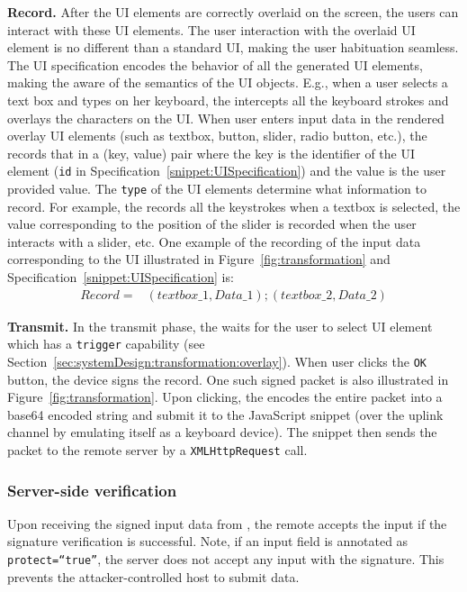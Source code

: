 \begin{mylist}
\item \textbf{Record.} After the UI elements are correctly overlaid on the screen, the users can interact with these UI elements. The user interaction with the overlaid UI element is no different than a standard UI, making the user habituation seamless. The UI specification encodes the behavior of all the generated UI elements, making the \device aware of the semantics of the UI objects. E.g., when a user selects a text box and types on her keyboard, the \device intercepts all the keyboard strokes and overlays the characters on the UI.
When user enters input data in the rendered overlay UI elements (such as textbox, button, slider, radio button, etc.), the \device records that in a (key, value) pair where the key is the identifier of the UI element (\texttt{id} in Specification~\ref{snippet:UISpecification}) and the value is the user provided value. The \texttt{type} of the UI elements determine what information to record. For example, the \device records all the keystrokes when a textbox is selected, the value corresponding to the position of the slider is recorded when the user interacts with a slider, etc. One example of the recording of the input data corresponding to the UI illustrated in Figure~\ref{fig:transformation} and Specification~\ref{snippet:UISpecification} is: 
\begin{align*}
Record = & (textbox\_1, Data\_1);(textbox\_2,Data\_2)
\end{align*}

\item \textbf{Transmit.} In the transmit phase, the \device waits for the user to select UI element which has a \texttt{trigger} capability (see Section~\ref{sec:systemDesign:transformation:overlay}).  When user clicks the \texttt{OK} button, the device signs the record. One such signed packet is also illustrated in Figure~\ref{fig:transformation}. Upon clicking, the \device encodes the entire packet into a base64 encoded string and submit it to the \name JavaScript snippet (over the uplink channel by emulating itself as a keyboard device). The \name \js snippet then sends the packet to the remote server by a \texttt{XMLHttpRequest} call.
\end{mylist} 

\subsubsection{Server-side verification} \label{sec:systemDesign:commit:verification}Upon receiving the signed input data from \device, the remote accepts the input if the signature verification is successful. Note, if an input field is annotated as \texttt{protect=``true''}, the server does not accept any input with the \device signature. This prevents the attacker-controlled host to submit data. 

